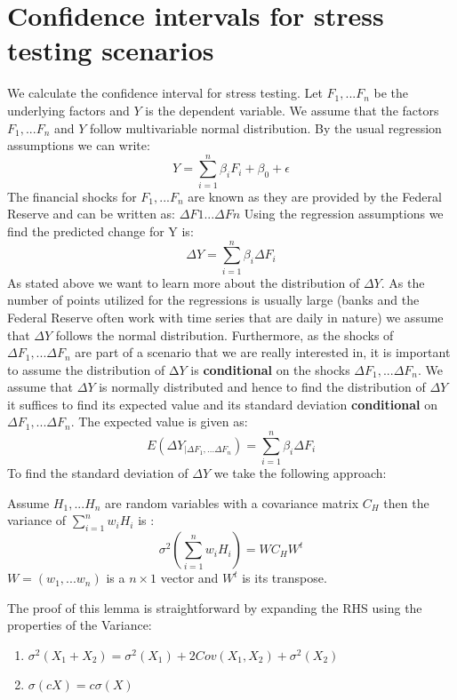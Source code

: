 \documentclass[a4paper]{amsart}
\begin{document}
\section{Confidence intervals for stress testing scenarios} 
We calculate the confidence interval for stress testing. Let $F_1,...F_n$ be the  underlying factors and $Y$ is the dependent variable. We assume that the factors $F_1,...F_n$ and $Y$ follow multivariable normal distribution. By the usual regression assumptions we can write: 
\begin{equation}
Y=\sum_{i=1}^n\beta_iF_i+\beta_0+\epsilon 
\end{equation}
The financial shocks for $F_1, ...F_n$ are known as they are provided by the Federal Reserve and can be written as: $\Delta F1...\Delta Fn$ Using the regression assumptions we find the predicted change for Y is: 
\begin{equation}
\Delta Y =\sum_{i=1}^n\beta_i\Delta F_i
\end{equation}
As stated above we want to learn more about the distribution of $\Delta Y.$ As the number of points utilized for the regressions is usually large (banks and the Federal Reserve often work with time series that are daily in nature) we assume that $\Delta Y$ follows the normal distribution. Furthermore, as the shocks of $\Delta F_1,...\Delta F_n$ are part of a scenario that we are really interested in, it is important to assume the distribution of $∆Y$ is \textbf{conditional} on the shocks $\Delta F_1,...\Delta F_n.$ We assume that $\Delta Y$ is normally distributed and hence to find the distribution of $\Delta Y$ it suffices to find its expected value and its standard deviation \textbf{conditional} on $\Delta F_1,...\Delta F_n.$ The expected value is given as:
\begin{equation}
E(\Delta Y_{|\Delta F_1,...\Delta F_n})=\sum_{i=1}^n\beta_i\Delta F_i
\end{equation} 
To find the standard deviation of $\Delta Y$ we take the following approach: 
\begin{lem}
Assume $H_1,...H_n$ are random variables with a covariance matrix $C_H$ then the variance of $\sum_{i=1}^nw_iH_i$ is : 
\begin{equation}
\sigma^2\left(\sum_{i=1}^nw_iH_i\right)=WC_HW^t
\end{equation}
$W=\left(w_1,...w_n\right)$ is a $n\times 1$ vector and $W^t$ is its transpose. 
\end{lem}
The proof of this lemma is straightforward by expanding the RHS using the properties of the Variance: 
\begin{enumerate}
\item $\sigma^2(X_1+X_2)=\sigma^2(X_1)+2Cov(X_1,X_2)+\sigma^2(X_2)$
\item $\sigma(cX)=c\sigma(X)$
\end{enumerate}
\end{document}
